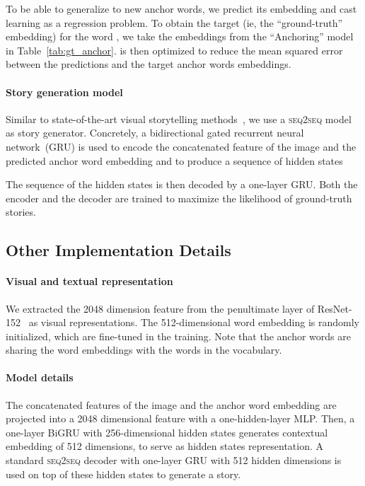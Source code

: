 To be able to generalize to new anchor words, we predict its embedding and cast learning  as a regression problem. To obtain the target (ie, the ``ground-truth'' embedding) for the word , we take the embeddings from the ``Anchoring'' model in Table~\ref{tab:gt_anchor}.  is then optimized to reduce the mean squared error between the predictions and the target anchor words embeddings.

\vspace{-10pt}

\paragraph{Story generation model} Similar to state-of-the-art visual storytelling methods~\cite{wang2018no,huang2016visual}, we use a \textsc{seq2seq} model~\cite{sutskever2014sequence} as story generator. Concretely, a bidirectional gated recurrent neural network~\cite{chung2014empirical}(GRU) is used to encode the concatenated feature of the image and the predicted anchor word embedding and to produce a sequence of hidden states
    \vspace{-5pt}

The sequence of the hidden states is then decoded by a one-layer GRU.  Both the encoder and the decoder are trained to maximize the likelihood of ground-truth stories.

\subsection{Other Implementation Details}

\paragraph{Visual and textual representation} We extracted the 2048 dimension feature from the penultimate layer of ResNet-152~\cite{he2016deep} as visual representations. The 512-dimensional word embedding is randomly initialized, which are fine-tuned in the training. Note that the anchor words are sharing the word embeddings with the words in the vocabulary.

\vspace{-10pt}

\paragraph{Model details} The concatenated features of the image and the anchor word embedding are projected into a 2048 dimensional feature with a one-hidden-layer MLP. Then, a one-layer BiGRU with 256-dimensional hidden states generates contextual embedding  of 512 dimensions, to serve as hidden states representation. A standard \textsc{seq2seq} decoder with one-layer GRU with 512 hidden dimensions is used on top of these hidden states to generate a story.

